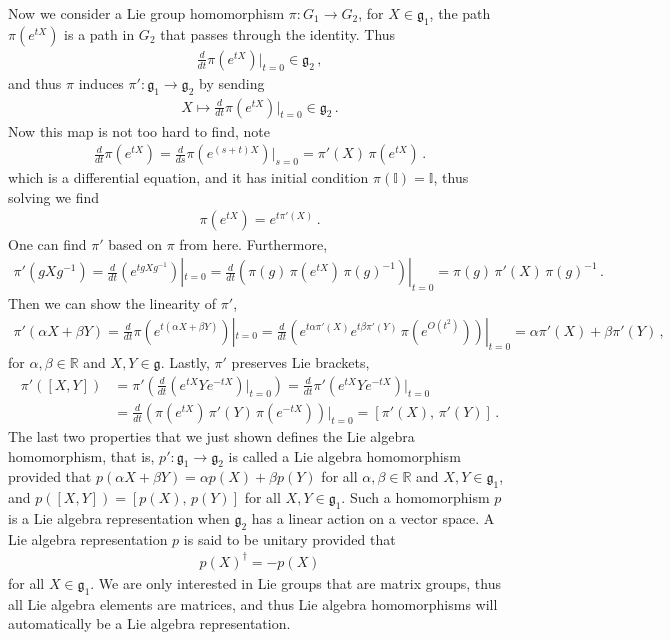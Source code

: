 \documentclass[11pt, onesided]{book}
\theoremstyle{break}
\theoremstyle{break}
\newcommand{\R}{\mathbb{R}}
\begin{document}
Now we consider a Lie group homomorphism $\pi:G_1 \to G_2$, for $X \in \mathfrak{g}_1$, the path $\pi(e^{tX})$ is a path in $G_2$ that passes through the identity. Thus
\begin{align*}
\frac{d}{dt}\pi(e^{tX})|_{t=0} \in \mathfrak{g}_2\,,
\end{align*}
and thus $\pi$ induces $\pi':\mathfrak{g}_1 \to \mathfrak{g}_2$ by sending
\begin{align*}
X\mapsto \frac{d}{dt}\pi(e^{tX})|_{t=0} \in \mathfrak{g}_2\,.
\end{align*}
Now this map is not too hard to find, note
\begin{align*}
\frac{d}{dt}\pi(e^{tX}) = \frac{d}{ds}\pi(e^{(s+t)X})|_{s=0} = \pi'(X)\, \pi(e^{tX})\,.
\end{align*}
which is a differential equation, and it has initial condition $\pi(\mathbb{I}) = \mathbb{I}$, thus solving we find
\begin{align*}
\pi (e^{tX}) = e^{t\pi'(X)}\,.
\end{align*}
One can find $\pi'$ based on $\pi$ from here. Furthermore, 
\begin{align*}
\pi'(gXg^{-1}) = \frac{d}{dt}(e^{tgXg^{-1}})|_{t=0} = \frac{d}{dt}\left(\pi(g)\, \pi(e^{tX})\,\pi(g)^{-1}\right)|_{t=0} = \pi (g) \, \pi'(X) \, \pi(g)^{-1}\,.
\end{align*}
Then we can show the linearity of $\pi'$,
\begin{align*}
\pi'(\alpha X + \beta Y) = \frac{d}{dt}\pi(e^{t(\alpha X + \beta Y)})|_{t=0} = \frac{d}{dt}\left(e^{t\alpha \pi'(X)}e^{t\beta \pi'(Y)}\, \pi(e^{O(t^2)})\right)|_{t=0} = \alpha \pi'(X) + \beta \pi'(Y)\,,
\end{align*}
for $\alpha,\beta \in \R$ and $X,Y \in \mathfrak{g}$. Lastly, $\pi'$ preserves Lie brackets,
\begin{align*}
\pi'([X,Y]) &= \pi'\left(\frac{d}{dt}\left( e^{tX}Ye^{-tX}\right)|_{t=0}\right) = \frac{d}{dt}\pi'(e^{tX}Y e^{-tX})|_{t=0}\\
&= \frac{d}{dt}\left( \pi(e^{tX})\,\pi'(Y)\, \pi(e^{-tX})\right)|_{t=0} = [\pi'(X), \, \pi'(Y)]\,.
\end{align*}
The last two properties that we just shown defines the Lie algebra homomorphism, that is,
$
p': \mathfrak{g}_1\to \mathfrak{g}_2$ is called a Lie algebra homomorphism provided that $p(\alpha X + \beta Y) = \alpha p(X) + \beta p(Y)$ for all $\alpha,\beta \in \R$ and $X,Y \in \mathfrak{g}_1$, and $p([X,Y]) = [p(X),\, p(Y)]$ for all  $X,Y \in \mathfrak{g}_1$. Such a homomorphism $p$ is a Lie algebra representation when $\mathfrak{g}_2$ has a linear action on a vector space. A Lie algebra representation $p$ is said to be unitary provided that 
\begin{align*}
p(X)^\dagger = -p(X)
\end{align*}
for all $X \in \mathfrak{g}_1$. We are only interested in Lie groups that are matrix groups, thus all Lie algebra elements are matrices, and thus Lie algebra homomorphisms will automatically be a Lie algebra representation. \\
\end{document}
